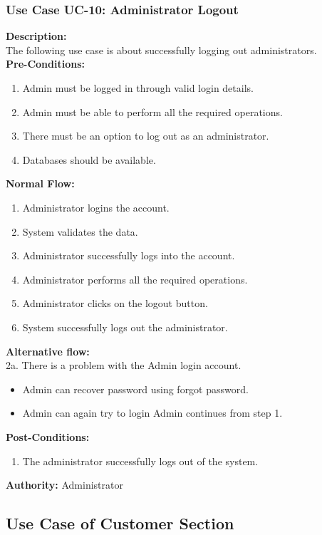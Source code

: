 \subsubsection{ Use Case UC-10: Administrator Logout}
\textbf{Description:}\\
The following use case is about successfully logging out administrators.
\\
\textbf{Pre-Conditions:}
\begin{enumerate}
    \item Admin must be logged in through valid login details.
    \item  Admin must be able to perform all the required operations.
    \item  There must be an option to log out as an administrator.
    \item Databases should be available.
\end{enumerate}
\textbf{Normal Flow:}\\
\begin{enumerate}
\item Administrator logins the account.
\item System validates the data. 
\item Administrator successfully logs into the account. 
\item Administrator performs all the required operations.
\item Administrator clicks on the logout button. 
\item System successfully logs out the administrator.
\end{enumerate}
\textbf{Alternative flow:} \\ 
2a. There is a problem with the Admin login account. 
 \\
\begin{itemize}
    \item Admin can recover password using forgot password.
     \item Admin can again try to login Admin continues from step 1.
\end{itemize}
\textbf{Post-Conditions: }
\begin{enumerate}
\item	The administrator successfully logs out of the system.
\end{enumerate}
\textbf{Authority:}
Administrator

\subsection{Use Case of Customer Section}
        
